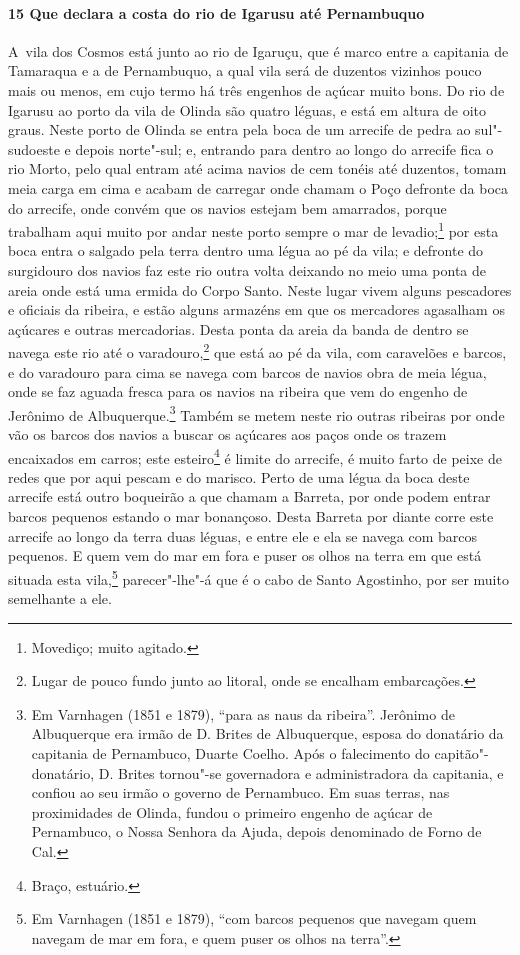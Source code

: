 \begin{linenumbers}
\paragraph{15 Que declara a costa do rio de Igarusu até Pernambuquo} \quad
\mbox{A vila} dos Cosmos está junto ao rio de Igaruçu, que é marco entre a capitania de Tamaraqua
e a de Pernambuquo, a qual vila será de duzentos vizinhos pouco mais ou menos, em cujo
termo há três engenhos de açúcar muito bons. Do rio de Igarusu ao porto da vila de Olinda
são quatro léguas, e está em altura de oito graus. Neste porto de Olinda se entra pela
boca de um arrecife de pedra ao sul"-sudoeste e depois norte"-sul; e, entrando para dentro
ao longo do arrecife fica o rio Morto, pelo qual entram até acima navios de cem tonéis até
duzentos, tomam meia carga em cima e acabam de carregar onde chamam o Poço defronte da
boca do arrecife, onde convém que os navios estejam bem amarrados, porque trabalham aqui
muito por andar neste porto sempre o mar de levadio;\footnote{ Movediço; muito agitado.}
por esta boca entra o salgado pela terra dentro uma légua ao pé da vila; e defronte do
surgidouro dos navios faz este rio outra volta deixando no meio uma ponta de areia onde
está uma ermida do Corpo Santo. Neste lugar vivem alguns pescadores e oficiais da ribeira,
e estão alguns armazéns em que os mercadores agasalham os açúcares e outras mercadorias.
Desta ponta da areia da banda de dentro se navega este rio até o varadouro,\footnote{ Lugar
de pouco fundo junto ao litoral, onde se encalham embarcações.} que está ao pé da vila,
com caravelões e barcos, e do varadouro para cima se navega com barcos de navios obra de
meia légua, onde se faz aguada fresca para os navios na ribeira que vem do engenho de
Jerônimo de Albuquerque.\footnote{ Em Varnhagen (1851 e 1879), ``para as naus da
ribeira''. Jerônimo de Albuquerque era irmão de D. Brites de Albuquerque, esposa do
donatário da capitania de Pernambuco, Duarte Coelho. Após o falecimento do
capitão"-donatário, D. Brites tornou"-se governadora e administradora da capitania, e
confiou ao seu irmão o governo de Pernambuco. Em suas terras, nas proximidades de Olinda,
fundou o primeiro engenho de açúcar de Pernambuco, o Nossa Senhora da Ajuda, depois
denominado de Forno de Cal.} Também se metem neste rio outras ribeiras por onde vão os
barcos dos navios a buscar os açúcares aos paços onde os trazem encaixados em carros; este
esteiro\footnote{ Braço, estuário.} é limite do arrecife, é muito farto de peixe de redes
que por aqui pescam e do marisco. Perto de uma légua da boca deste arrecife está outro
boqueirão a que chamam a Barreta, por onde podem entrar barcos pequenos estando o mar
bonançoso. Desta Barreta por diante corre este arrecife ao longo da terra duas léguas, e
entre ele e ela se navega com barcos pequenos. E quem vem do mar em fora e puser os olhos
na terra em que está situada esta vila,\footnote{ Em Varnhagen (1851 e 1879), ``com barcos
pequenos que navegam quem navegam de mar em fora, e quem puser os olhos na terra''.}
parecer"-lhe"-á que é o cabo de Santo Agostinho, por ser muito semelhante a ele.


\end{linenumbers}
